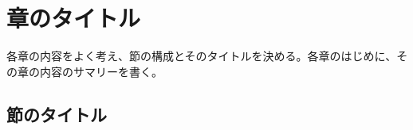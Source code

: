 \setcounter{chapter}{2}
\chapter{章のタイトル}
各章の内容をよく考え、節の構成とそのタイトルを決める。各章のはじめに、その章の内容のサマリーを書く。
\section{節のタイトル}